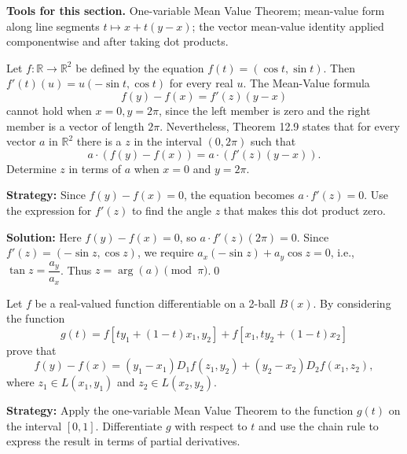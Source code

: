 \noindent\textbf{Tools for this section.} One-variable Mean Value Theorem; mean-value form along line segments $t\mapsto x+t(y-x)$; the vector mean-value identity applied componentwise and after taking dot products.



\begin{problembox}
\begin{problemstatement}
Let \( f: \mathbb{R} \rightarrow \mathbb{R}^2 \) be defined by the equation \( f(t) = (\cos t, \sin t) \). Then \( f'(t)(u) = u(-\sin t, \cos t) \) for every real \( u \). The Mean-Value formula
\[f(y) - f(x) = f'(z)(y - x)\]
cannot hold when \( x = 0, y = 2\pi \), since the left member is zero and the right member is a vector of length \( 2\pi \). Nevertheless, Theorem 12.9 states that for every vector \( a \) in \( \mathbb{R}^2 \) there is a \( z \) in the interval \( (0, 2\pi) \) such that
\[a \cdot (f(y) - f(x)) = a \cdot (f'(z)(y - x)).\]
Determine \( z \) in terms of \( a \) when \( x = 0 \) and \( y = 2\pi \).
\end{problemstatement}
\end{problembox}

\noindent\textbf{Strategy:} Since \( f(y) - f(x) = 0 \), the equation becomes \( a \cdot f'(z) = 0 \). Use the expression for \( f'(z) \) to find the angle \( z \) that makes this dot product zero.

\bigskip\noindent\textbf{Solution:}
Here $f(y)-f(x)=0$, so $a\cdot f'(z)(2\pi)=0$. Since $f'(z)=(-\sin z,\cos z)$, we require $a_x(-\sin z)+a_y\cos z=0$, i.e., $\tan z=\dfrac{a_y}{a_x}$. Thus $z=\arg(a)\pmod{\pi}$.\qed


\begin{problembox}
\begin{problemstatement}
Let \( f \) be a real-valued function differentiable on a 2-ball \( B(x) \). By considering the function
\[g(t) = f[ty_1 + (1 - t)x_1, y_2] + f[x_1, ty_2 + (1 - t)x_2]\]
prove that
\[f(y) - f(x) = (y_1 - x_1)D_1f(z_1, y_2) + (y_2 - x_2)D_2f(x_1, z_2),\]
where \( z_1 \in L(x_1, y_1) \) and \( z_2 \in L(x_2, y_2) \).
\end{problemstatement}
\end{problembox}

\noindent\textbf{Strategy:} Apply the one-variable Mean Value Theorem to the function \( g(t) \) on the interval \( [0,1] \). Differentiate \( g \) with respect to \( t \) and use the chain rule to express the result in terms of partial derivatives.

